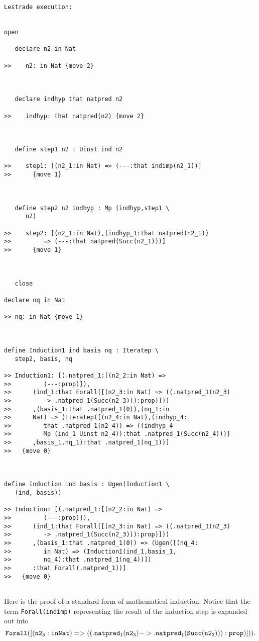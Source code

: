 \documentclass[12pt]{article}
\begin{document}
\begin{verbatim}Lestrade execution:


open

   declare n2 in Nat

>>    n2: in Nat {move 2}



   declare indhyp that natpred n2

>>    indhyp: that natpred(n2) {move 2}



   define step1 n2 : Uinst ind n2

>>    step1: [(n2_1:in Nat) => (---:that indimp(n2_1))]
>>      {move 1}



   define step2 n2 indhyp : Mp (indhyp,step1 \
      n2)

>>    step2: [(n2_1:in Nat),(indhyp_1:that natpred(n2_1))
>>         => (---:that natpred(Succ(n2_1)))]
>>      {move 1}



   close

declare nq in Nat

>> nq: in Nat {move 1}



define Induction1 ind basis nq : Iteratep \
   step2, basis, nq

>> Induction1: [(.natpred_1:[(n2_2:in Nat) =>
>>         (---:prop)]),
>>      (ind_1:that Forall([(n2_3:in Nat) => ((.natpred_1(n2_3)
>>         -> .natpred_1(Succ(n2_3))):prop)]))
>>      ,(basis_1:that .natpred_1(0)),(nq_1:in
>>      Nat) => (Iteratep([(n2_4:in Nat),(indhyp_4:
>>         that .natpred_1(n2_4)) => ((indhyp_4
>>         Mp (ind_1 Uinst n2_4)):that .natpred_1(Succ(n2_4)))]
>>      ,basis_1,nq_1):that .natpred_1(nq_1))]
>>   {move 0}



define Induction ind basis : Ugen(Induction1 \
   (ind, basis))

>> Induction: [(.natpred_1:[(n2_2:in Nat) =>
>>         (---:prop)]),
>>      (ind_1:that Forall([(n2_3:in Nat) => ((.natpred_1(n2_3)
>>         -> .natpred_1(Succ(n2_3))):prop)]))
>>      ,(basis_1:that .natpred_1(0)) => (Ugen([(nq_4:
>>         in Nat) => (Induction1(ind_1,basis_1,
>>         nq_4):that .natpred_1(nq_4))])
>>      :that Forall(.natpred_1))]
>>   {move 0}


\end{verbatim}

Here is the proof of a standard form of mathematical induction.  Notice that the term {\tt Forall(indimp)}  representing the result of the induction step is expanded out into $${\tt Forall([(n2_3:in Nat) => ((.natpred_1(n2_3)  -> .natpred_1(Succ(n2_3))):prop)]))}.$$  
\end{document}
